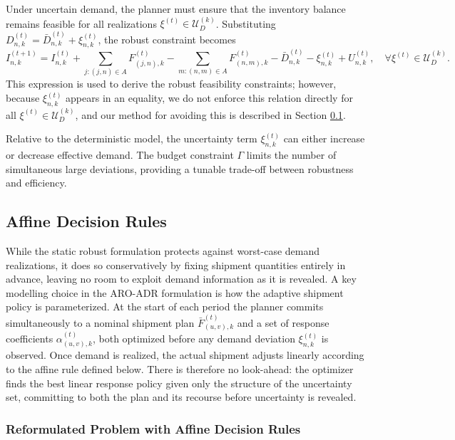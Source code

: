 \documentclass{article}
\begin{document}
Under uncertain demand, the planner must ensure that the inventory balance remains feasible for all realizations \(\xi^{(t)} \in \mathcal{U}_D^{(k)}\). Substituting \(D^{(t)}_{n,k} = \bar{D}^{(t)}_{n,k} + \xi^{(t)}_{n,k}\), the robust constraint becomes
\begin{equation}
I^{(t+1)}_{n,k} =
I^{(t)}_{n,k}
+ \sum_{j:(j,n)\in A} F^{(t)}_{(j,n),k}
- \sum_{m:(n,m)\in A} F^{(t)}_{(n,m),k}
- \bar{D}^{(t)}_{n,k}
- \xi^{(t)}_{n,k}
+ U^{(t)}_{n,k},
\quad \forall \xi^{(t)} \in \mathcal{U}_D^{(k)}.
\end{equation}
This expression is used to derive the robust feasibility constraints; however, because $\xi_{n,k}^{(t)}$ appears in an equality, we do not enforce this relation directly for all $\xi^{(t)} \in \mathcal{U}_D^{(k)}$, and our method for avoiding this is described in Section \ref{5.5}.

Relative to the deterministic model, the uncertainty term \(\xi_{n,k}^{(t)}\) can either increase or decrease effective demand. The budget constraint \(\Gamma\) limits the number of simultaneous large deviations, providing a tunable trade-off between robustness and efficiency.

\subsection{Affine Decision Rules}
\label{5.5}

While the static robust formulation protects against worst-case demand realizations, it does so conservatively by fixing shipment quantities entirely in advance, leaving no room to exploit demand information as it is revealed. A key modelling choice in the ARO-ADR formulation is how the adaptive shipment policy is parameterized. At the start of each period the planner commits simultaneously to a nominal shipment plan $\bar{F}_{(u,v),k}^{(t)}$ and a set of response coefficients $\alpha_{(u,v),k}^{(t)}$, both optimized before any demand deviation $\xi_{n,k}^{(t)}$ is observed. Once demand is realized, the actual shipment adjusts linearly according to the affine rule defined below. There is therefore no look-ahead: the optimizer finds the best linear response policy given only the structure of the uncertainty set, committing to both the plan and its recourse before uncertainty is revealed.

\subsubsection{Reformulated Problem with Affine Decision Rules}
\end{document}
